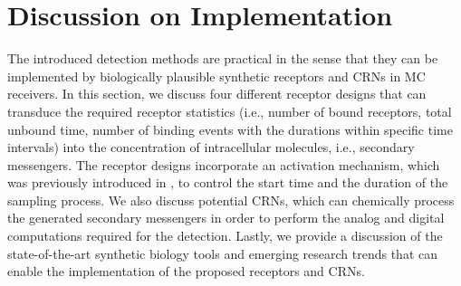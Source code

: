 \documentclass[twocolumn]{IEEEtran}
\begin{document}
\section{Discussion on Implementation} 
\label{sec:implementation}
The introduced detection methods are practical in the sense that they can be implemented by biologically plausible synthetic receptors and CRNs in MC receivers. In this section, we discuss four different receptor designs that can transduce the required receptor statistics (i.e., number of bound receptors, total unbound time, number of binding events with the durations within specific time intervals) into the concentration of intracellular molecules, i.e., secondary messengers. The receptor designs incorporate an activation mechanism, which was previously introduced in \cite{kuscu2019channel}, to control the start time and the duration of the sampling process. We also discuss potential CRNs, which can chemically process the generated secondary messengers in order to perform the analog and digital computations required for the detection. Lastly, we provide a discussion of the state-of-the-art synthetic biology tools and emerging research trends that can enable the implementation of the proposed receptors and CRNs.
%
%

\end{document}
